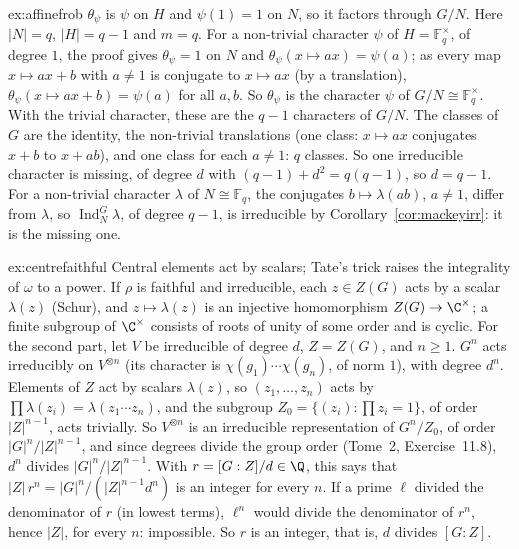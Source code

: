 \begin{solution}{ex:affinefrob}
\idea $\theta_\psi$ is $\psi$ on $H$ and $\psi(1)=1$ on $N$, so it factors through $G/N$.
\writeup Here $|N|=q$, $|H|=q-1$ and $m=q$. For a non-trivial character $\psi$ of $H=\mathbb F_q^\times$, of degree $1$, the proof gives $\theta_\psi=1$ on $N$ and $\theta_\psi(x\mapsto ax)=\psi(a)$; as every map $x\mapsto ax+b$ with $a\ne1$ is
conjugate to $x\mapsto ax$ (by a translation), $\theta_\psi(x\mapsto ax+b)=\psi(a)$ for all $a,b$. So $\theta_\psi$ is the character $\psi$ of $G/N\cong\mathbb F_q^\times$. With the trivial character, these are the $q-1$ characters of $G/N$. The
classes of $G$ are the identity, the non-trivial translations (one class: $x\mapsto ax$ conjugates $x+b$ to $x+ab$), and one class for each $a\ne1$: $q$ classes. So one irreducible character is missing, of degree $d$ with
$(q-1)+d^2=q(q-1)$, so $d=q-1$. For a non-trivial character $\lambda$ of $N\cong\mathbb F_q$, the conjugates $b\mapsto\lambda(ab)$, $a\ne1$, differ from $\lambda$, so $\operatorname{Ind}_N^G\lambda$, of degree $q-1$, is irreducible by
Corollary~\ref{cor:mackeyirr}: it is the missing one.
\end{solution}

\begin{solution}{ex:centrefaithful}
\idea Central elements act by scalars; Tate's trick raises the integrality of $\omega$ to a power.
\writeup If $\rho$ is faithful and irreducible, each $z\in Z(G)$ acts by a scalar $\lambda(z)$ (Schur), and $z\mapsto\lambda(z)$ is an injective homomorphism $Z(G)\to\C^\times$; a finite subgroup of $\C^\times$ consists of roots of unity of
some order and is cyclic. For the second part, let $V$ be irreducible of degree $d$, $Z=Z(G)$, and $n\ge1$. $G^n$ acts irreducibly on $V^{\otimes n}$ (its character is $\chi(g_1)\cdots\chi(g_n)$, of norm $1$), with degree $d^n$.
Elements of $Z$ act by scalars $\lambda(z)$, so $(z_1,\dots,z_n)$ acts by $\prod\lambda(z_i)=\lambda(z_1\cdots z_n)$, and the subgroup $Z_0=\{(z_i):\prod z_i=1\}$, of order $|Z|^{n-1}$, acts trivially. So $V^{\otimes n}$ is an irreducible
representation of $G^n/Z_0$, of order $|G|^n/|Z|^{n-1}$, and since degrees divide the group order (Tome~2, Exercise~11.8), $d^n$ divides $|G|^n/|Z|^{n-1}$. With $r=[G:Z]/d\in\Q$, this says that $|Z|\,r^n=|G|^n/(|Z|^{n-1}d^n)$ is an integer for every $n$. If a prime $\ell$ divided the
denominator of $r$ (in lowest terms), $\ell^n$ would divide the denominator of $r^n$, hence $|Z|$, for every $n$: impossible. So $r$ is an integer, that is, $d$ divides $[G:Z]$.
\end{solution}

